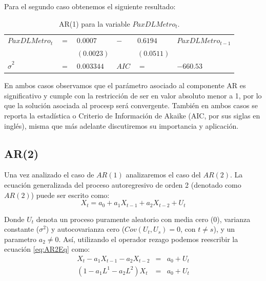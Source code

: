 \documentclass[
]{book}
\begin{document}
Para el segundo caso obtenemos el siguiente resultado:

\begin{longtable}[]{@{}
  >{\centering\arraybackslash}p{}
  >{\centering\arraybackslash}p{}
  >{\centering\arraybackslash}p{}
  >{\centering\arraybackslash}p{}
  >{\centering\arraybackslash}p{}
  >{\centering\arraybackslash}p{}@{}}
\caption{\label{tab:AR0101} AR(1) para la variable \(PaxDLMetro_t\).}\tabularnewline
\toprule\noalign{}
\endfirsthead
\endhead
\bottomrule\noalign{}
\endlastfoot
\(PaxDLMetro_t\) & \(=\) & \(0.0007\) & \(-\) & \(0.6194\) & \(PaxDLMetro_{t-1}\) \\
& & \((0.0023)\) & & \((0.0511)\) & \\
\(\hat{\sigma}^2\) & \(=\) & \(0.003344\) & \(AIC\) & \(=\) & \(-660.53\) \\
\end{longtable}

En ambos casos observamos que el parámetro asociado al componente AR es significativo y cumple con la restricción de ser en valor absoluto menor a 1, por lo que la solución asociada al procesp será convergente. También en ambos casos se reporta la estadística o Criterio de Información de Akaike (AIC, por sus siglas en inglés), misma que más adelante discutiremos su importancia y aplicación.

\hypertarget{ar2}{%
\subsection{AR(2)}\label{ar2}}

Una vez analizado el caso de \(AR(1)\) analizaremos el caso del \(AR(2)\). La ecuación generalizada del proceso autoregresivo de orden 2 (denotado como \(AR(2)\)) puede ser escrito como:
\begin{equation}
    X_t = a_0 + a_1 X_{t-1} + a_2 X_{t-2} + U_t
    \label{eq:AR2Eq}
\end{equation}

Donde \(U_t\) denota un proceso puramente aleatorio con media cero (\(0\)), varianza constante (\(\sigma^2\)) y autocovarianza cero (\(Cov(U_t, U_s) = 0\), con \(t \neq s\)), y un parametro \(a_2 \neq 0\). Así, utilizando el operador rezago podemos reescribir la ecuación
\eqref{eq:AR2Eq} como:
\begin{eqnarray*}     
    X_t - a_1 X_{t-1} - a_2 X_{t-2} & = & a_0 + U_t \\
    (1 - a_1 L^1 - a_2 L^2) X_t & = & a_0 + U_t
\end{eqnarray*}
\end{document}
